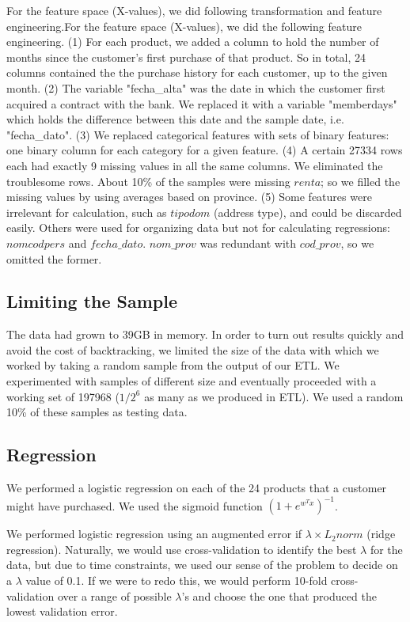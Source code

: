 \documentclass{article}
\begin{document}
\begin{spacing}{1}
\begin{large}
For the feature space (X-values), we did following transformation and feature engineering.For the feature space (X-values), we did the following feature engineering. (1) For each product, we added a column to hold the number of months since the customer’s first purchase of that product. So in total, 24 columns contained the the purchase history for each customer, up to the given month. (2) The variable "fecha\_alta" was the date in which the customer first acquired a contract with the bank. We replaced it with a variable "memberdays" which holds the difference between this date and the sample date, i.e. "fecha\_dato". (3) We replaced categorical features with sets of binary features: one binary column for each category for a given feature. (4) A certain 27334 rows each had exactly 9 missing values in all the same columns. We eliminated the troublesome rows. About 10\% of the samples were missing $renta$; so we filled the missing values by using averages based on province. (5) Some features were irrelevant for calculation, such as $tipodom$ (address type), and could be discarded easily. Others were used for organizing data but not for calculating regressions: $nomcodpers$ and $fecha\_dato$. $nom\_prov$ was redundant with $cod\_prov$, so we omitted the former.
 
\subsection{Limiting the Sample}

The data had grown to 39GB in memory. In order to turn out results quickly and avoid the cost of backtracking, we limited the size of the data with which we worked by taking a random sample from the output of our ETL. We experimented with samples of different size and eventually proceeded with a working set of 197968 ($1/2^6$ as many as we produced in ETL). We used a random 10\% of these samples as testing data.

\subsection{Regression}

We performed a logistic regression on each of the 24 products that a customer might have purchased. We used the sigmoid function $(1+e^{w^Tx})^{-1}$.

We performed logistic regression using an augmented error if $\lambda \times L_2norm$ (ridge regression). Naturally, we would use cross-validation to identify the best $\lambda$ for the data, but due to time constraints, we used our sense of the problem to decide on a $\lambda$ value of 0.1. If we were to redo this, we would perform 10-fold cross-validation over a range of possible $\lambda$'s and choose the one that produced the lowest validation error.


\end{large}
\end{spacing}
\end{document}
